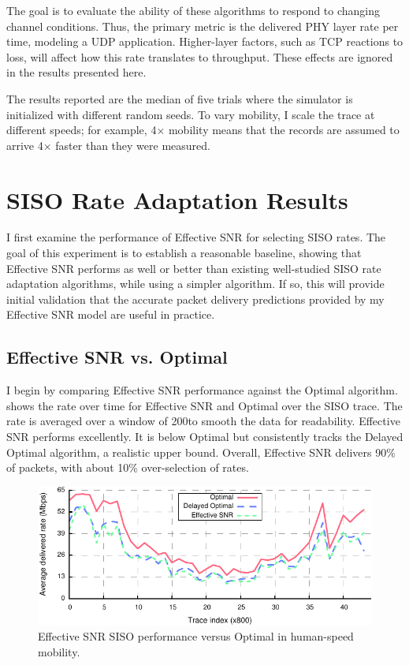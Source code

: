 The goal is to evaluate the ability of these algorithms to respond to changing channel conditions. Thus, the primary metric is the delivered PHY layer rate per time, modeling a UDP application. Higher-layer factors, such as TCP reactions to loss, will affect how this rate translates to throughput. These effects are ignored in the results presented here.

The results reported are the median of five trials where the simulator is initialized with different random seeds. To vary mobility, I scale the trace at different speeds; for example, 4$\times$ mobility means that the records are assumed to arrive 4$\times$ faster than they were measured.

\section{SISO Rate Adaptation Results}
I first examine the performance of Effective SNR for selecting SISO rates. The goal of this experiment is to establish a reasonable baseline, showing that Effective SNR performs as well or better than existing well-studied SISO rate adaptation algorithms, while using a simpler algorithm. If so, this will provide initial validation that the accurate packet delivery predictions provided by my Effective SNR model are useful in practice.

\subsection{Effective SNR vs. Optimal}
I begin by comparing Effective SNR performance against the Optimal algorithm.  shows the rate over time for Effective SNR and Optimal over the SISO trace. The rate is averaged over a window of 200\ms to smooth the data for readability. Effective SNR performs excellently. It is below Optimal but consistently tracks the Delayed Optimal algorithm, a realistic upper bound. Overall, Effective SNR delivers 90\% of packets, with about 10\% over-selection of rates.

\begin{figure}[htbp]
      \centering
      \includegraphics[width=\textwidth]{figures/rate/siso_rate_time.pdf}
      \caption[Effective SNR SISO performance versus Optimal in human-speed mobility]{\label{fig:siso_rate_time_opt_eff} Effective SNR SISO performance versus Optimal in human-speed mobility.}
\end{figure}


